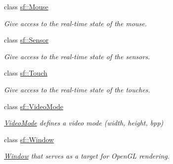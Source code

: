\begin{DoxyCompactItemize}
class \hyperlink{classsf_1_1_mouse}{sf\+::\+Mouse}
\begin{DoxyCompactList}\small\item\em Give access to the real-\/time state of the mouse. \end{DoxyCompactList}\item 
class \hyperlink{classsf_1_1_sensor}{sf\+::\+Sensor}
\begin{DoxyCompactList}\small\item\em Give access to the real-\/time state of the sensors. \end{DoxyCompactList}\item 
class \hyperlink{classsf_1_1_touch}{sf\+::\+Touch}
\begin{DoxyCompactList}\small\item\em Give access to the real-\/time state of the touches. \end{DoxyCompactList}\item 
class \hyperlink{classsf_1_1_video_mode}{sf\+::\+Video\+Mode}
\begin{DoxyCompactList}\small\item\em \hyperlink{classsf_1_1_video_mode}{Video\+Mode} defines a video mode (width, height, bpp) \end{DoxyCompactList}\item 
class \hyperlink{classsf_1_1_window}{sf\+::\+Window}
\begin{DoxyCompactList}\small\item\em \hyperlink{classsf_1_1_window}{Window} that serves as a target for Open\+GL rendering. \end{DoxyCompactList}\end{DoxyCompactItemize}
